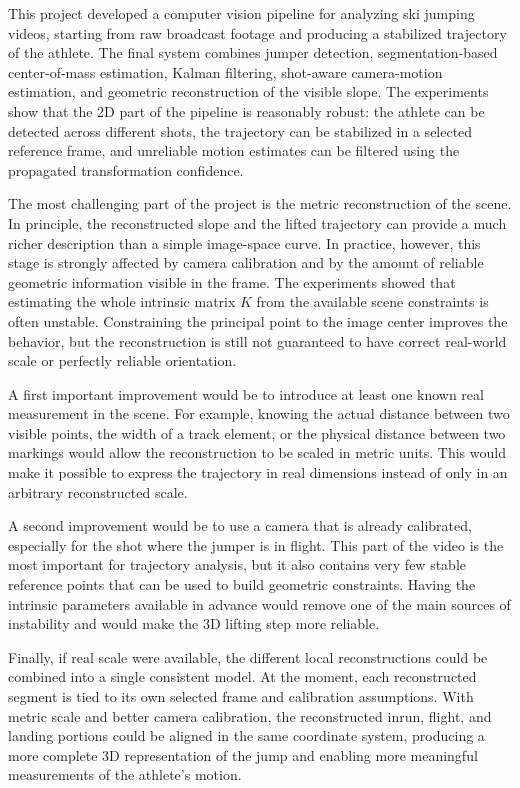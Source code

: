This project developed a computer vision pipeline for analyzing ski jumping videos, starting from raw broadcast footage and producing a stabilized trajectory of the athlete. The final system combines jumper detection, segmentation-based center-of-mass estimation, Kalman filtering, shot-aware camera-motion estimation, and geometric reconstruction of the visible slope. The experiments show that the 2D part of the pipeline is reasonably robust: the athlete can be detected across different shots, the trajectory can be stabilized in a selected reference frame, and unreliable motion estimates can be filtered using the propagated transformation confidence.

The most challenging part of the project is the metric reconstruction of the scene. In principle, the reconstructed slope and the lifted trajectory can provide a much richer description than a simple image-space curve. In practice, however, this stage is strongly affected by camera calibration and by the amount of reliable geometric information visible in the frame. The experiments showed that estimating the whole intrinsic matrix \(K\) from the available scene constraints is often unstable. Constraining the principal point to the image center improves the behavior, but the reconstruction is still not guaranteed to have correct real-world scale or perfectly reliable orientation.

A first important improvement would be to introduce at least one known real measurement in the scene. For example, knowing the actual distance between two visible points, the width of a track element, or the physical distance between two markings would allow the reconstruction to be scaled in metric units. This would make it possible to express the trajectory in real dimensions instead of only in an arbitrary reconstructed scale.

A second improvement would be to use a camera that is already calibrated, especially for the shot where the jumper is in flight. This part of the video is the most important for trajectory analysis, but it also contains very few stable reference points that can be used to build geometric constraints. Having the intrinsic parameters available in advance would remove one of the main sources of instability and would make the 3D lifting step more reliable.

Finally, if real scale were available, the different local reconstructions could be combined into a single consistent model. At the moment, each reconstructed segment is tied to its own selected frame and calibration assumptions. With metric scale and better camera calibration, the reconstructed inrun, flight, and landing portions could be aligned in the same coordinate system, producing a more complete 3D representation of the jump and enabling more meaningful measurements of the athlete's motion.
